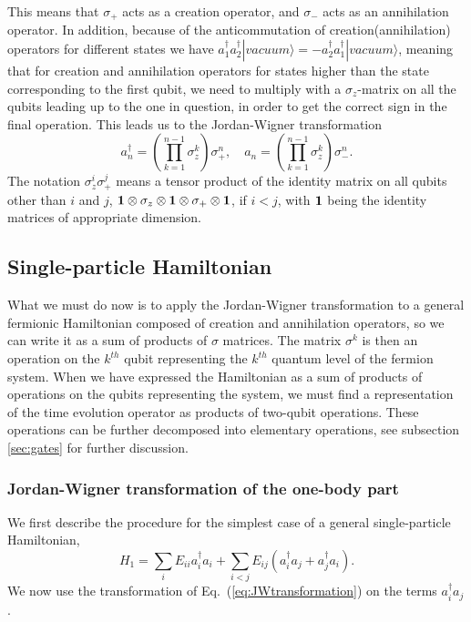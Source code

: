 \documentclass[aps,pra,twocolumn,floatfix]{revtex4}
\begin{document}
This means that $\sigma_+$ acts as a creation operator, and $\sigma_-$
acts as an annihilation operator. In addition, because of the
anticommutation of creation(annihilation)  operators for different states we have 
$a_1^\dag a_2^\dag
|vacuum\rangle = - a_2^\dag a_1^\dag |vacuum\rangle$, meaning that for creation and
annihilation operators for states higher than the state corresponding
to the first qubit, we need to multiply with a $\sigma_z$-matrix on
all the qubits leading up to the one in question, in order  to get the correct
sign in the final operation. This leads us to the Jordan-Wigner
transformation \cite{somma2002,ortiz2002}
\begin{equation}
\label{eq:JWtransformation}
a^\dag_n = \left(\prod_{k=1}^{n-1} \sigma_z^k\right) \sigma_+^n, \quad 
a_n = \left(\prod_{k=1}^{n-1} \sigma_z^k\right) \sigma_-^n.
\end{equation}
The notation $\sigma_z^i\sigma_+^j$ means a tensor product of the
identity matrix on all qubits other than $i$ and $j$, ${\bf 1}\otimes
\sigma_z \otimes {\bf 1} \otimes \sigma_+\otimes{\bf 1}$, if $i<j$, with ${\bf 1}$
being the  identity matrices of appropriate dimension.





\subsection{Single-particle Hamiltonian}
\label{sec:1partH}
What we must do now is to apply the Jordan-Wigner transformation to a
general fermionic Hamiltonian composed of creation and annihilation
operators, so we can write it as a sum of products of $\sigma$
matrices. The matrix $\sigma^k$ is then an operation on the $k^{th}$
qubit representing the $k^{th}$ quantum level of the fermion system.
When we have expressed the Hamiltonian as a sum of products of
operations on the qubits representing the system, we must find a
representation of the time evolution operator as products of two-qubit
operations. These operations can be further decomposed into elementary
operations, see subsection \ref{sec:gates} for further discussion.


\subsubsection{Jordan-Wigner transformation of the one-body part}
We first describe the procedure for the 
simplest case of a general single-particle Hamiltonian,
\begin{equation}
H_1=\sum_{i} E_{ii} a^\dag_i a_i +
\sum_{i<j} E_{ij} (a^\dag_i a_j + a^\dag_j a_i).
\end{equation} 
We now  use the transformation  of  
Eq.~(\ref{eq:JWtransformation}) on the terms $a^\dag_i a_j$. 
\end{document}
